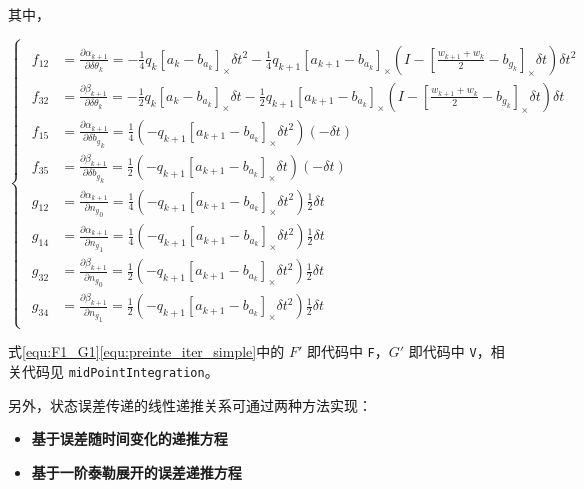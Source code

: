 \documentclass[12pt,a4paper]{article}
\begin{document}
其中，

\begin{equation}
\begin{cases}
\begin{aligned}
f_{12} &= \frac{\partial{\alpha_{k+1}}}{\partial{\delta \theta_k}} = 
-\frac{1}{4}q_{k}[a_{k}-b_{a_{k}}]_{\times}\delta t^{2}-\frac{1}{4}q_{k+1}[a_{k+1}-b_{a_{k}}]_{\times}(I-[\frac{w_{k+1}+w_{k}}{2}-b_{g_{k}}]_{\times }\delta t)\delta t^{2} \\
f_{32} &= \frac{\partial{\beta_{k+1}}}{\partial{\delta \theta_k}} =
-\frac{1}{2}q_{k}[a_{k}-b_{a_{k}}]_{\times}\delta t-\frac{1}{2}q_{k+1}[a_{k+1}-b_{a_{k}}]_{\times}(I-[\frac{w_{k+1}+w_{k}}{2}-b_{g_{k}}]_{\times }\delta t)\delta t \\
f_{15} &= \frac{\partial{\alpha_{k+1}}}{\partial{\delta {b_g}_k}} =
\frac{1}{4}(-q_{k+1}[a_{k+1}-b_{a_{k}}]_{\times}\delta t^{2})(-\delta t) \\
f_{35} &= \frac{\partial{\beta_{k+1}}}{\partial{\delta {b_g}_k}} =
\frac{1}{2}(-q_{k+1}[a_{k+1}-b_{a_{k}}]_{\times}\delta t)(-\delta t) \\
g_{12} &= \frac{\partial{\alpha_{k+1}}}{\partial{{n_g}_0}} = 
\frac{1}{4}(-q_{k+1}[a_{k+1}-b_{a_{k}}]_{\times}\delta t^{2})\frac{1}{2}\delta t \\
g_{14} &= \frac{\partial{\alpha_{k+1}}}{\partial{{n_g}_1}} = 
\frac{1}{4}(-q_{k+1}[a_{k+1}-b_{a_{k}}]_{\times}\delta t^{2})\frac{1}{2}\delta t \\
g_{32} &= \frac{\partial{\beta_{k+1}}}{\partial{{n_g}_0}} =
\frac{1}{2}(-q_{k+1}[a_{k+1}-b_{a_{k}}]_{\times}\delta t^{2})\frac{1}{2}\delta t \\
g_{34} &= \frac{\partial{\beta_{k+1}}}{\partial{{n_g}_1}} =
\frac{1}{2}(-q_{k+1}[a_{k+1}-b_{a_{k}}]_{\times}\delta t^{2})\frac{1}{2}\delta t
\end{aligned}
\end{cases}
\end{equation}

式\eqref{equ:F1_G1}\eqref{equ:preinte_iter_simple}中的 $F'$ 即代码中 \verb|F|，$G'$ 即代码中 \verb|V|，相关代码见 \verb|midPointIntegration|。

另外，状态误差传递的线性递推关系可通过两种方法实现：

\begin{itemize}[itemindent=1em]
  \item \textbf{基于误差随时间变化的递推方程}
  \item \textbf{基于一阶泰勒展开的误差递推方程}
\end{itemize}
\end{document}
